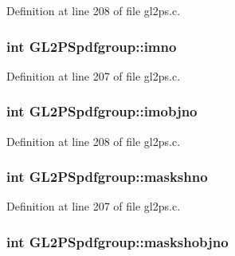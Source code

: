 Definition at line 208 of file gl2ps.\+c.

\hypertarget{struct_g_l2_p_spdfgroup_a4129702ebefb954113a539c9e6c84629}{}
\subsubsection[{imno}]{\setlength{\rightskip}{0pt plus 5cm}int G\+L2\+P\+Spdfgroup\+::imno}\label{struct_g_l2_p_spdfgroup_a4129702ebefb954113a539c9e6c84629}


Definition at line 207 of file gl2ps.\+c.

\hypertarget{struct_g_l2_p_spdfgroup_a6d4c378ecf26fa2eb26ce95c5df3f09b}{}
\subsubsection[{imobjno}]{\setlength{\rightskip}{0pt plus 5cm}int G\+L2\+P\+Spdfgroup\+::imobjno}\label{struct_g_l2_p_spdfgroup_a6d4c378ecf26fa2eb26ce95c5df3f09b}


Definition at line 208 of file gl2ps.\+c.

\hypertarget{struct_g_l2_p_spdfgroup_ae4b35a90b5490ed66d2526865012dd6d}{}
\subsubsection[{maskshno}]{\setlength{\rightskip}{0pt plus 5cm}int G\+L2\+P\+Spdfgroup\+::maskshno}\label{struct_g_l2_p_spdfgroup_ae4b35a90b5490ed66d2526865012dd6d}


Definition at line 207 of file gl2ps.\+c.

\hypertarget{struct_g_l2_p_spdfgroup_ad1cc1b17423f57a78f09e018eee75667}{}
\subsubsection[{maskshobjno}]{\setlength{\rightskip}{0pt plus 5cm}int G\+L2\+P\+Spdfgroup\+::maskshobjno}\label{struct_g_l2_p_spdfgroup_ad1cc1b17423f57a78f09e018eee75667}


